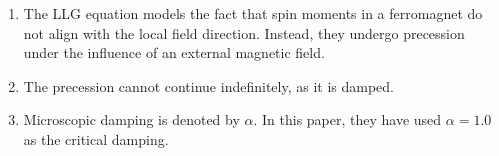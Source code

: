 \begin{enumerate}
\begin{enumerate} [\ding{212}]
        \item Applied field was varied from: $+1.0$ T to $-1.0$ T in steps of $0.001$ T.
        \item The details of time-steps are;
        \begin{verbatim}
            equilibration-time-steps=100000
            loop-time-steps=100000
            time-step = 1.0e-15
        \end{verbatim}   
    \end{enumerate}
    \item The LLG equation models the fact that spin moments in a ferromagnet do not align with the local field direction. Instead, they undergo precession under the influence of an external magnetic field.
    \item The precession cannot continue indefinitely, as it is damped.
    \item Microscopic damping is denoted by $\alpha$. In this paper, they have used $\alpha=1.0$ as the critical damping.
\end{enumerate}

